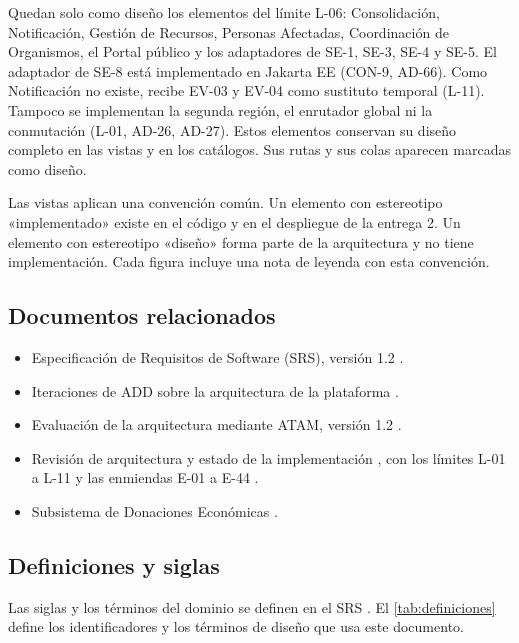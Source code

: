 \documentclass[11pt,letterpaper]{article}
\begin{document}
Quedan solo como diseño los elementos del límite L-06: Consolidación, Notificación, Gestión de
Recursos, Personas Afectadas, Coordinación de Organismos, el Portal público y los adaptadores de
SE-1, SE-3, SE-4 y SE-5. El adaptador de SE-8 está implementado en Jakarta EE (CON-9, AD-66). Como
Notificación no existe, recibe EV-03 y EV-04 como sustituto temporal (L-11). Tampoco se implementan la segunda región, el enrutador global ni la
conmutación (L-01, AD-26, AD-27). Estos elementos conservan su diseño completo en las vistas y en los
catálogos. Sus rutas y sus colas aparecen marcadas como diseño.

Las vistas aplican una convención común. Un elemento con estereotipo «implementado» existe en el
código y en el despliegue de la entrega 2. Un elemento con estereotipo «diseño» forma parte de la
arquitectura y no tiene implementación. Cada figura incluye una nota de leyenda con esta convención.

\subsection{Documentos relacionados}

\begin{itemize}
  \item Especificación de Requisitos de Software (SRS), versión 1.2 \cite{srs}.
  \item Iteraciones de ADD sobre la arquitectura de la plataforma \cite{iteraciones}.
  \item Evaluación de la arquitectura mediante ATAM, versión 1.2 \cite{atam}.
  \item Revisión de arquitectura y estado de la implementación \cite{revision}, con los límites
        L-01 a L-11 y las enmiendas E-01 a E-44 \cite{enmiendas}.
  \item Subsistema de Donaciones Económicas \cite{donaciones}.
\end{itemize}

\subsection{Definiciones y siglas}

Las siglas y los términos del dominio se definen en el SRS \cite{srs}. El \cref{tab:definiciones}
define los identificadores y los términos de diseño que usa este documento.
\end{document}

